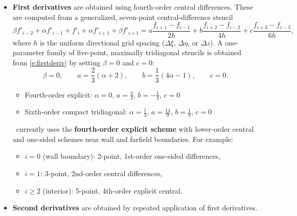 \documentclass[letterpaper,10pt]{article}
\begin{document}
\begin{itemize}
  \setlength{\itemsep}{1em}
\item \textbf{First derivatives} are obtained using fourth-order central differences. These are computed from a generalized, seven-point central-difference stencil~\cite{Lele1992}
  \begin{equation}
    \beta f'_{i-2} + \alpha f'_{i-1} + f'_i + \alpha f'_{i+1} + \beta f'_{i+1} = %
    a\frac{f_{i+1}-f_{i-1}}{2h} + b\frac{f_{i+2}-f_{i-2}}{4h} + c\frac{f_{i+3}-f_{i-3}}{6h},
    \label{e:firstderiv}
  \end{equation}
  where $h$ is the uniform directional grid spacing ($\Delta\xi$, $\Delta\eta$, or $\Delta z$). A one-parameter family of five-point, maximally tridiagonal stencils is obtained from \eqref{e:firstderiv} by setting $\beta=0$ and $c=0$:
  \begin{equation*}
    \beta=0, \qquad a=\frac{2}{3}(\alpha+2), \qquad b=\frac{1}{3}(4\alpha-1), \qquad c=0.
  \end{equation*}
  \begin{itemize}
  \item {Fourth-order explicit:} $\alpha=0$, $a=\frac{4}{3}$, $b=-\frac{1}{3}$, $c=0$
  \item {Sixth-order compact tridiagonal:} $\alpha=\frac{1}{3}$, $a=\frac{14}{9}$, $b=\frac{1}{9}$, $c=0$
  \end{itemize}
  \code\ currently uses the \textbf{fourth-order explicit scheme} with lower-order central and one-sided schemes near wall and farfield boundaries. For example:
  \begin{itemize}
  \item $i=0$ (wall boundary): 2-point, 1st-order one-sided differences,
  \item $i=1$: 3-point, 2nd-order central differences,
  \item $i\geq 2$ (interior): 5-point, 4th-order explicit central.
  \end{itemize}


\item \textbf{Second derivatives} are obtained by repeated application of first derivatives.



\end{itemize}
\end{document}
